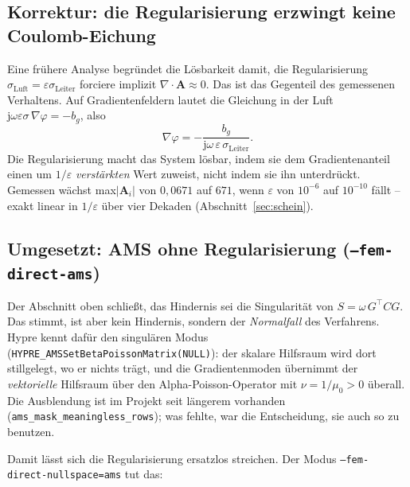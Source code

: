 \documentclass[11pt,a4paper]{article}
\newcommand{\Ai}{\mathbf{A}_i}
\begin{document}
\subsection{Korrektur: die Regularisierung erzwingt keine Coulomb-Eichung}

Eine frühere Analyse begründet die Lösbarkeit damit, die Regularisierung
$\sigma_{\text{Luft}} = \varepsilon\sigma_{\text{Leiter}}$ forciere implizit
$\nabla\cdot\mathbf{A}\approx 0$. Das ist das Gegenteil des gemessenen
Verhaltens. Auf Gradientenfeldern lautet die Gleichung in der Luft
$\mathrm{j}\omega\varepsilon\sigma\,\nabla\varphi = -b_g$, also
\begin{equation}
  \nabla\varphi = -\frac{b_g}{\mathrm{j}\omega\,\varepsilon\,\sigma_{\text{Leiter}}}.
\end{equation}
Die Regularisierung macht das System lösbar, indem sie dem Gradientenanteil
einen um $1/\varepsilon$ \emph{verstärkten} Wert zuweist, nicht indem sie ihn
unterdrückt. Gemessen wächst max$|\Ai|$ von $0{,}0671$ auf $671$, wenn
$\varepsilon$ von $10^{-6}$ auf $10^{-10}$ fällt -- exakt linear in
$1/\varepsilon$ über vier Dekaden (Abschnitt~\ref{sec:schein}).

\subsection{Umgesetzt: AMS ohne Regularisierung (\texttt{--fem-direct-ams})}
\label{sec:ams-modus}

Der Abschnitt oben schließt, das Hindernis sei die Singularität von
$S = \omega\,G^{\!\top}CG$. Das stimmt, ist aber kein Hindernis, sondern der
\emph{Normalfall} des Verfahrens. Hypre kennt dafür den singulären Modus
(\texttt{HYPRE\_AMSSetBetaPoissonMatrix(NULL)}): der skalare Hilfsraum wird
dort stillgelegt, wo er nichts trägt, und die Gradientenmoden übernimmt der
\emph{vektorielle} Hilfsraum über den Alpha-Poisson-Operator mit
$\nu = 1/\mu_0 > 0$ überall. Die Ausblendung ist im Projekt seit längerem
vorhanden (\texttt{ams\_mask\_meaningless\_rows}); was fehlte, war die
Entscheidung, sie auch so zu benutzen.

Damit lässt sich die Regularisierung ersatzlos streichen. Der Modus
\texttt{--fem-direct-nullspace=ams} tut das:
\end{document}
